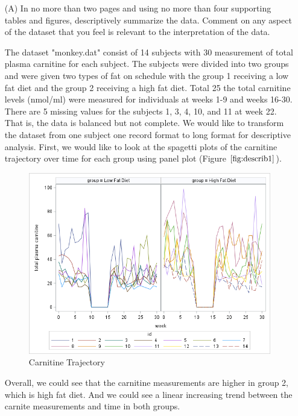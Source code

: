 							\begin{itemize}
							  \vspace{0.2cm} 
								\item[(A)] In no more than two pages and using no more than four supporting tables and figures, descriptively 
													 summarize the data. Comment on any aspect of the dataset that you
													 feel is relevant to the interpretation of the data. \vspace{0.2cm}

The dataset "monkey.dat" consist of 14 subjects with 30 measurement of total plasma carnitine for each subject. The subjects were divided into two groups and were given two types of fat on schedule with the group 1 receiving a low fat diet and the group 2 receiving a high fat diet. Total 25 the total carnitine levels (nmol/ml) were measured for individuals at weeks 1-9 and weeks 16-30. There are 5 missing values for the subjects 1, 3, 4, 10, and 11 at week 22. That is, the data is balanced but not complete.
We would like to transform the dataset from one subject one record format to long format for descriptive analysis. First, we would like to look at the spagetti plots of the carnitine trajectory over time for each group using panel plot (Figure $\ref{fig:describ1}$). 

\begin{figure}
    \centering
    \includegraphics[scale=1]{HW4/img/desc1.png}
    \caption{Carnitine Trajectory}
\label{fig:describ1}
\end{figure}

Overall, we could see that the carnitine measurements are higher in group 2, which is high fat diet. And we could see a linear increasing trend between the carnite measurements and time in both groups. 


\end{itemize}

